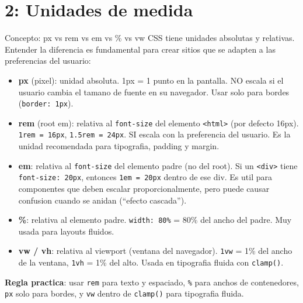 \documentclass[11pt,a4paper]{article}
\begin{document}
	\section{2: Unidades de medida}
	
	\begin{cajaconcepto}{Concepto: px vs rem vs em vs \% vs vw}
		CSS tiene unidades absolutas y relativas. Entender la diferencia es fundamental para crear sitios que se adapten a las preferencias del usuario:
		
		\begin{itemize}[leftmargin=1.2em,itemsep=3pt]
			\item \textbf{px} (pixel): unidad absoluta. 1px = 1 punto en la pantalla. NO escala si el usuario cambia el tamano de fuente en su navegador. Usar solo para bordes (\texttt{border: 1px}).
			\item \textbf{rem} (root em): relativa al \texttt{font-size} del elemento \texttt{<html>} (por defecto 16px). \texttt{1rem = 16px}, \texttt{1.5rem = 24px}. SI escala con la preferencia del usuario. Es la unidad recomendada para tipografia, padding y margin.
			\item \textbf{em}: relativa al \texttt{font-size} del elemento padre (no del root). Si un \texttt{<div>} tiene \texttt{font-size: 20px}, entonces \texttt{1em = 20px} dentro de ese div. Es util para componentes que deben escalar proporcionalmente, pero puede causar confusion cuando se anidan (``efecto cascada'').
			\item \textbf{\%}: relativa al elemento padre. \texttt{width: 80\%} = 80\% del ancho del padre. Muy usada para layouts fluidos.
			\item \textbf{vw / vh}: relativa al viewport (ventana del navegador). \texttt{1vw} = 1\% del ancho de la ventana, \texttt{1vh} = 1\% del alto. Usada en tipografia fluida con \texttt{clamp()}.
		\end{itemize}
		
		\textbf{Regla practica}: usar \texttt{rem} para texto y espaciado, \texttt{\%} para anchos de contenedores, \texttt{px} solo para bordes, y \texttt{vw} dentro de \texttt{clamp()} para tipografia fluida.
	\end{cajaconcepto}
	
\end{document}
